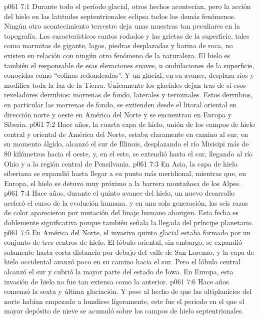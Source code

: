 \vs p061 7:1 Durante todo el período glacial, otros hechos acontecían, pero la acción del hielo en las latitudes septentrionales eclipsa todos los demás fenómenos. Ningún otro acontecimiento terrestre deja unas muestras tan peculiares en la topografía. Los característicos cantos rodados y las grietas de la superficie, tales como marmitas de gigante, lagos, piedras desplazadas y harina de roca, no existen en relación con ningún otro fenómeno de la naturaleza. El hielo es también el responsable de esas elevaciones suaves, u ondulaciones de la superficie, conocidas como “colinas redondeadas”. Y un glacial, en su avance, desplaza ríos y modifica toda la faz de la Tierra. Únicamente los glaciales dejan tras de sí esos reveladores derrubios: morrenas de fondo, laterales y terminales. Estos derrubios, en particular las morrenas de fondo, se extienden desde el litoral oriental en dirección norte y oeste en América del Norte y se encuentran en Europa y Siberia.
\vs p061 7:2 \pc Hace  años, la cuarta capa de hielo, unión de los campos de hielo central y oriental de América del Norte, estaba claramente en camino al sur; en su momento álgido, alcanzó el sur de Illinois, desplazando el río Misisipi más de 80 kilómetros hacia el oeste, y, en el este, se extendió hasta el sur, llegando al río Ohio y a la región central de Pensilvania.
\vs p061 7:3 En Asia, la capa de hielo siberiana se expandió hasta llegar a su punto más meridional, mientras que, en Europa, el hielo se detuvo muy próximo a la barrera montañosa de los Alpes.
\vs p061 7:4 \pc Hace  años, durante el quinto avance del hielo, un nuevo desarrollo aceleró el curso de la evolución humana.  y en una sola generación, las seis razas de color aparecieron por mutación del linaje humano aborigen. Esta fecha es doblemente significativa porque también señala la llegada del príncipe planetario.
\vs p061 7:5 En América del Norte, el invasivo quinto glacial estaba formado por un conjunto de tres centros de hielo. El lóbulo oriental, sin embargo, se expandió solamente hasta corta distancia por debajo del valle de San Lorenzo, y la capa de hielo occidental avanzó poco en su camino hacia el sur. Pero el lóbulo central alcanzó el sur y cubrió la mayor parte del estado de Iowa. En Europa, esta invasión de hielo no fue tan extensa como la anterior.
\vs p061 7:6 \pc Hace  años comenzó la sexta y última glaciación. Y pese al hecho de que las altiplanicies del norte habían empezado a hundirse ligeramente, este fue el periodo en el que el mayor depósito de nieve se acumuló sobre los campos de hielo septentrionales.
